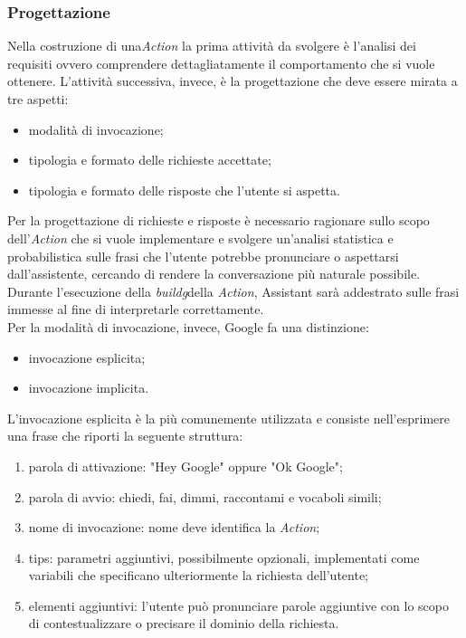 		\subsubsection{Progettazione}
		Nella costruzione di una\emph{Action} la prima attività da svolgere è l'analisi dei requisiti ovvero comprendere dettagliatamente il comportamento che si vuole ottenere. L'attività successiva, invece, è la progettazione che deve essere mirata a tre aspetti:
		\begin{itemize}
			\item modalità di invocazione;
			\item tipologia e formato delle richieste accettate;
			\item tipologia e formato delle risposte che l'utente si aspetta.
		\end{itemize}
		Per la progettazione di richieste e risposte è necessario ragionare sullo scopo dell'\emph{Action} che si vuole implementare e svolgere un'analisi statistica e probabilistica sulle frasi che l'utente potrebbe pronunciare o aspettarsi dall'assistente, cercando di rendere la conversazione più naturale possibile. Durante l'esecuzione della \emph{\gls{buildg}}\glsfirstoccur della \emph{Action}, Assistant sarà addestrato sulle frasi immesse al fine di interpretarle correttamente. \\
		Per la modalità di invocazione, invece, Google fa una distinzione:
		\begin{itemize}
			\item invocazione esplicita;
			\item invocazione implicita.
		\end{itemize}
		L'invocazione esplicita è la più comunemente utilizzata e consiste nell'esprimere una frase che riporti la seguente struttura:
		\begin{enumerate}
			\item parola di attivazione: "Hey Google" oppure "Ok Google";
			\item parola di avvio: chiedi, fai, dimmi, raccontami e vocaboli simili;
			\item nome di invocazione: nome deve identifica la \emph{Action};
			\item tips: parametri aggiuntivi, possibilmente opzionali, implementati come variabili che specificano ulteriormente la richiesta dell'utente;
			\item elementi aggiuntivi: l'utente può pronunciare parole aggiuntive con lo scopo di contestualizzare o precisare il dominio della richiesta.
		\end{enumerate}
